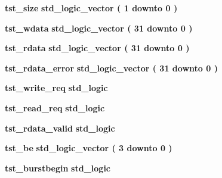 \begin{DoxyCompactItemize}
\item 
{\bf tst\+\_\+size} {\bfseries \textcolor{comment}{std\+\_\+logic\+\_\+vector}\textcolor{vhdlchar}{ }\textcolor{vhdlchar}{(}\textcolor{vhdlchar}{ }\textcolor{vhdlchar}{ } \textcolor{vhdldigit}{1} \textcolor{vhdlchar}{ }\textcolor{keywordflow}{downto}\textcolor{vhdlchar}{ }\textcolor{vhdlchar}{ } \textcolor{vhdldigit}{0} \textcolor{vhdlchar}{ }\textcolor{vhdlchar}{)}\textcolor{vhdlchar}{ }} 
\item 
{\bf tst\+\_\+wdata} {\bfseries \textcolor{comment}{std\+\_\+logic\+\_\+vector}\textcolor{vhdlchar}{ }\textcolor{vhdlchar}{(}\textcolor{vhdlchar}{ }\textcolor{vhdlchar}{ } \textcolor{vhdldigit}{31} \textcolor{vhdlchar}{ }\textcolor{keywordflow}{downto}\textcolor{vhdlchar}{ }\textcolor{vhdlchar}{ } \textcolor{vhdldigit}{0} \textcolor{vhdlchar}{ }\textcolor{vhdlchar}{)}\textcolor{vhdlchar}{ }} 
\item 
{\bf tst\+\_\+rdata} {\bfseries \textcolor{comment}{std\+\_\+logic\+\_\+vector}\textcolor{vhdlchar}{ }\textcolor{vhdlchar}{(}\textcolor{vhdlchar}{ }\textcolor{vhdlchar}{ } \textcolor{vhdldigit}{31} \textcolor{vhdlchar}{ }\textcolor{keywordflow}{downto}\textcolor{vhdlchar}{ }\textcolor{vhdlchar}{ } \textcolor{vhdldigit}{0} \textcolor{vhdlchar}{ }\textcolor{vhdlchar}{)}\textcolor{vhdlchar}{ }} 
\item 
{\bf tst\+\_\+rdata\+\_\+error} {\bfseries \textcolor{comment}{std\+\_\+logic\+\_\+vector}\textcolor{vhdlchar}{ }\textcolor{vhdlchar}{(}\textcolor{vhdlchar}{ }\textcolor{vhdlchar}{ } \textcolor{vhdldigit}{31} \textcolor{vhdlchar}{ }\textcolor{keywordflow}{downto}\textcolor{vhdlchar}{ }\textcolor{vhdlchar}{ } \textcolor{vhdldigit}{0} \textcolor{vhdlchar}{ }\textcolor{vhdlchar}{)}\textcolor{vhdlchar}{ }} 
\item 
{\bf tst\+\_\+write\+\_\+req} {\bfseries \textcolor{comment}{std\+\_\+logic}\textcolor{vhdlchar}{ }} 
\item 
{\bf tst\+\_\+read\+\_\+req} {\bfseries \textcolor{comment}{std\+\_\+logic}\textcolor{vhdlchar}{ }} 
\item 
{\bf tst\+\_\+rdata\+\_\+valid} {\bfseries \textcolor{comment}{std\+\_\+logic}\textcolor{vhdlchar}{ }} 
\item 
{\bf tst\+\_\+be} {\bfseries \textcolor{comment}{std\+\_\+logic\+\_\+vector}\textcolor{vhdlchar}{ }\textcolor{vhdlchar}{(}\textcolor{vhdlchar}{ }\textcolor{vhdlchar}{ } \textcolor{vhdldigit}{3} \textcolor{vhdlchar}{ }\textcolor{keywordflow}{downto}\textcolor{vhdlchar}{ }\textcolor{vhdlchar}{ } \textcolor{vhdldigit}{0} \textcolor{vhdlchar}{ }\textcolor{vhdlchar}{)}\textcolor{vhdlchar}{ }} 
\item 
{\bf tst\+\_\+burstbegin} {\bfseries \textcolor{comment}{std\+\_\+logic}\textcolor{vhdlchar}{ }} 
\end{DoxyCompactItemize}
